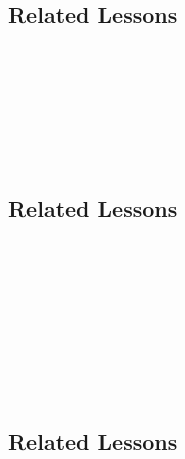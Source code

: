 \subsection{Related Lessons}
\fourbTwo{}\\
\fourgTwo{}\\
\fourgFour{}\\
\fourgSix{}\\
\fourkEight{}\\
\fourkNine{}\\
%
\subsection{Related Lessons}
\fourgSix{}\\
\fouriSix{}\\
\fourjSix{}\\
\fourjSeven{}\\
\fourkOne{}\\
\fourkThree{}\\
\fourkEight{}\\
\fourkNine{}\\
%
\subsection{Related Lessons} 
\fourgOne{}\\
\fourgThree{}\\
\fourgSix{}\\
\fourgSeven{}\\
\fourFKThirteen{}\\
\fourFKTwentySix{}\\
